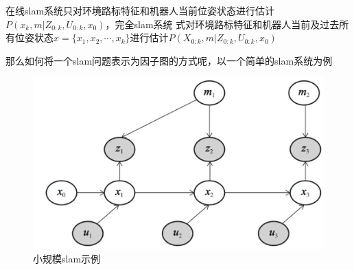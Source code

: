 \documentclass[10pt]{article}
\begin{document}
在线slam系统只对环境路标特征和机器人当前位姿状态进行估计$P(x_k,m|Z_{0:k},U_{0:k},x_0)$，完全slam系统
式对环境路标特征和机器人当前及过去所有位姿状态$x=\{x_1,x_2,\cdots,x_k\}$进行估计$P(X_{0:k},m|Z_{0:k},
U_{0:k},x_0)$

那么如何将一个slam问题表示为因子图的方式呢，以一个简单的slam系统为例
\begin{figure}[!htb]
    \centering
   \includegraphics[scale=0.5]{images/小规模slam.png}
   \caption{小规模slam示例}
\end{figure} 
\end{document}
